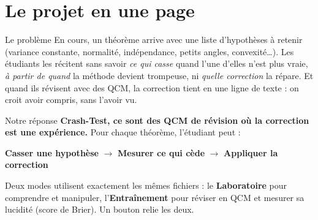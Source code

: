 \documentclass[11pt,a4paper]{article}
\begin{document}
\section*{Le projet en une page}

\begin{keybox}{Le problème}
En cours, un théorème arrive avec une liste d'hypothèses à retenir (variance constante, normalité, indépendance, petits angles, convexité\dots). Les étudiants les récitent sans savoir \emph{ce qui casse} quand l'une d'elles n'est plus vraie, \emph{à partir de quand} la méthode devient trompeuse, ni \emph{quelle correction} la répare. Et quand ils révisent avec des QCM, la correction tient en une ligne de texte : on croit avoir compris, sans l'avoir vu.
\end{keybox}

\begin{okbox}{Notre réponse}
\textbf{Crash-Test, ce sont des QCM de révision où la correction est une expérience.} Pour chaque théorème, l'étudiant peut :
\begin{center}
  \textbf{\color{ctBroken}Casser une hypothèse} $\longrightarrow$ \textbf{\color{ctMethod}Mesurer ce qui cède} $\longrightarrow$ \textbf{\color{ctCorrection}Appliquer la correction}
\end{center}
Deux modes utilisent exactement les mêmes fichiers : le \textbf{Laboratoire} pour comprendre et manipuler, l'\textbf{Entraînement} pour réviser en QCM et mesurer sa lucidité (score de Brier). Un bouton relie les deux.
\end{okbox}
\end{document}

